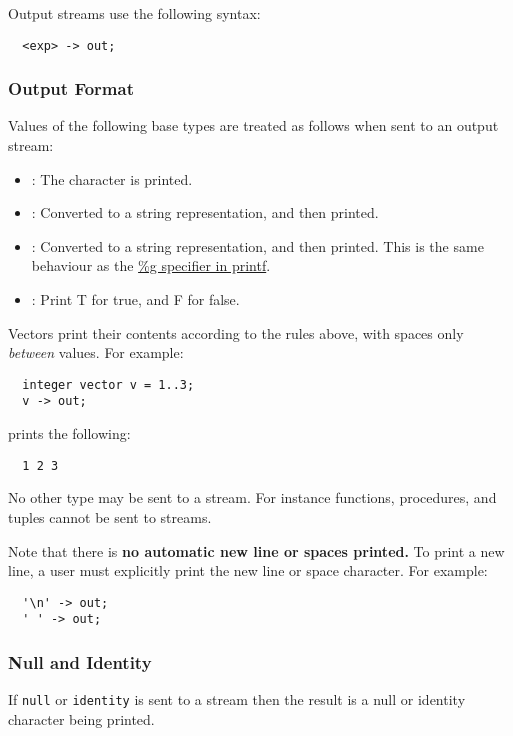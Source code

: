 \documentclass[streams.tex]{subfiles}
\begin{document}
Output streams use the following syntax:
\begin{lstlisting}
  <exp> -> out;
\end{lstlisting}

\subsubsection{Output Format}
\label{sssec:output_format}
Values of the following base types are treated as follows when sent to an output stream:
\begin{itemize}
  \item
    : The character is printed.
  \item
    : Converted to a string representation, and then printed.
  \item
    : Converted to a string representation, and then printed. This is the same behaviour
    as the \href{http://www.cplusplus.com/reference/cstdio/printf/}{\%g specifier in printf}.
  \item
    : Print T for true, and F for false.
\end{itemize}

Vectors print their contents according to the rules above, with spaces only \textit{between} values.
For example:
\begin{lstlisting}
  integer vector v = 1..3;
  v -> out;
\end{lstlisting}

prints the following:
\begin{lstlisting}
  1 2 3
\end{lstlisting}

No other type may be sent to a stream. For instance functions, procedures, and tuples cannot be sent
to streams.

Note that there is \textbf{no automatic new line or spaces printed.} To print a new line, a user
must explicitly print the new line or space character. For example:
\begin{lstlisting}
  '\n' -> out;
  ' ' -> out;
\end{lstlisting}

\subsubsection{Null and Identity}
\label{sssec:stream_nai}
If \texttt{null} or \texttt{identity} is sent to a stream then the result is a null or identity
character being printed.
\end{document}
